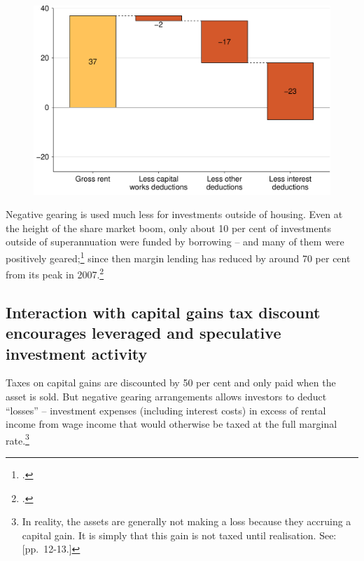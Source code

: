 \documentclass{grattan}\usepackage[]{graphicx}\usepackage[]{color}
\makeatletter
\newenvironment{kframe}{%
 \def\at@end@of@kframe{}%
 \ifinner\ifhmode%
  \def\at@end@of@kframe{\end{minipage}}%
  \begin{minipage}{\columnwidth}%
 \fi\fi%
 \def\FrameCommand##1{\hskip\@totalleftmargin \hskip-\fboxsep
 \colorbox{shadecolor}{##1}\hskip-\fboxsep
     \hskip-\linewidth \hskip-\@totalleftmargin \hskip\columnwidth}%
 \MakeFramed {\advance\hsize-\width
   \@totalleftmargin\z@ \linewidth\hsize
   \@setminipage}}%
 {\par\unskip\endMakeFramed%
 \at@end@of@kframe}
\newenvironment{knitrout}{}{} %
\makeatother
\begin{document}
\begin{knitrout}
\color{fgcolor}\begin{kframe}


{\ttfamily\noindent\bfseries\color{errorcolor}{\#\# Error in eval(expr, envir, enclos): object 'taxstats201213' not found}}\end{kframe}
\end{knitrout}
\begin{figure}
\includegraphics[width=\columnwidth]{figure/Interest_makes_up_the_bulk_of_rental_deductions-1}
\notes{}

\end{figure}

Negative gearing is used much less for investments outside of housing. Even at the height of the share market boom, only about 10 per cent of investments outside of superannuation were funded by borrowing -- and many of them were positively geared;\footcite{Daley2007}  since then margin lending has reduced by around 70 per cent from its peak in 2007.\footcite{RBA2015a}
\subsection{Interaction with capital gains tax discount encourages leveraged and speculative investment activity}
Taxes on capital gains are discounted by 50 per cent and only paid when the asset is sold. But negative gearing arrangements allows investors to deduct ``losses'' -- investment expenses  (including interest costs) in excess of rental income from wage income that would otherwise be taxed at the full marginal rate.\footnote{In reality, the assets are generally not making a loss because they accruing a capital gain. It is simply that this gain is not taxed until realisation. See: \textcite{ACOSS}[pp.~12-13.]}
\end{document}
